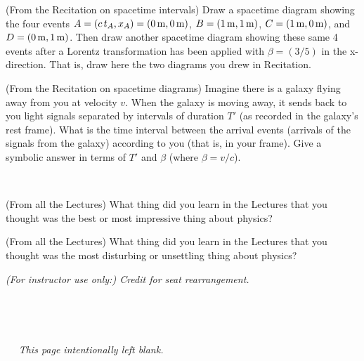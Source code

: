 \documentclass[12pt, letterpaper]{article}
\begin{document}
\vfill

\begin{problem} (From the Recitation on spacetime intervals)
  Draw a spacetime diagram showing the four events
  $A=(c\,t_A,x_A)=(0\,\mathrm{m},0\,\mathrm{m})$, $B=(1\,\mathrm{m},1\,\mathrm{m})$, $C=(1\,\mathrm{m},0\,\mathrm{m})$,
  and $D=(0\,\mathrm{m},1\,\mathrm{m})$.
  Then draw another spacetime diagram showing these same 4 events
  after a Lorentz transformation has been applied with $\beta=(3/5)$ in the x-direction.
  That is, draw here the two diagrams you drew in Recitation.
\end{problem}

\vfill

\begin{problem} (From the Recitation on spacetime diagrams)
  Imagine there is a galaxy flying away from you at velocity $v$.
  When the galaxy is moving away, it sends back to you light
  signals separated by intervals of duration $T'$ (as recorded in the galaxy's rest frame).
  What is the time interval between the arrival events (arrivals of
  the signals from the galaxy) according to you (that is, in your
  frame). Give a symbolic answer in terms of $T'$ and $\beta$ (where $\beta=v/c$).
\end{problem}

\vfill
~\clearpage

\begin{problem} (From all the Lectures)
  What thing did you learn in the Lectures that you thought was the best or most impressive thing about physics?
\end{problem}

\vfill

\begin{problem} (From all the Lectures)
  What thing did you learn in the Lectures that you thought was the most disturbing or unsettling thing about physics?
\end{problem}

\vfill

\noindent
\emph{(For instructor use only:) Credit for seat rearrangement.}

\vfill

~

\vfill
~\clearpage

~
\vfill
~\hfill\textsl{This page intentionally left blank.}\hfill~
\vfill
~
\end{document}
